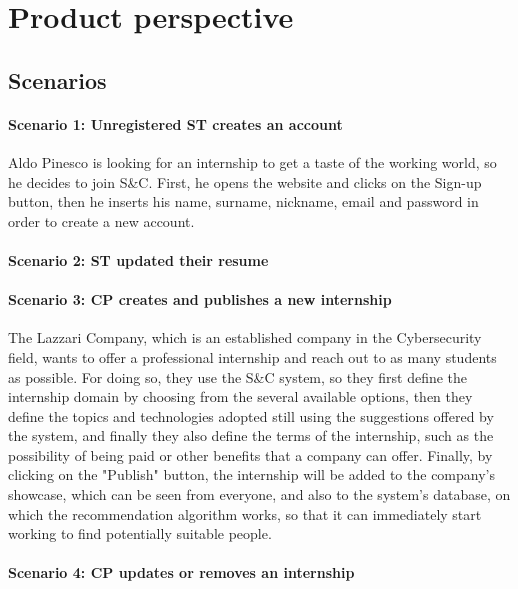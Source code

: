 \section{Product perspective}
\label{sec:product_perspective}%

\subsection{Scenarios}
\label{subsec:scenarios}%
\paragraph{Scenario 1: Unregistered ST creates an account}
Aldo Pinesco is looking for an internship to get a taste of the working world, so he decides to join S\&C. First, he opens the website and clicks on the Sign-up button, then he inserts his name, surname, nickname, email and password in order to create a new account.

\paragraph{Scenario 2: ST updated their resume}

\paragraph{Scenario 3: CP creates and publishes a new internship}
The Lazzari Company, which is an established company in the Cybersecurity field, wants to offer a professional internship and reach out to as many students as possible. For doing so, they use the S\&C system, so they first define the internship domain by choosing from the several available options, then they define the topics and technologies adopted still using the suggestions offered by the system, and finally they also define the terms of the internship, such as the possibility of being paid or other benefits that a company can offer. Finally, by clicking on the "Publish" button, the internship will be added to the company's showcase, which can be seen from everyone, and also to the system's database, on which the recommendation algorithm works, so that it can immediately start working to find potentially suitable people.

\paragraph{Scenario 4: CP updates or removes an internship}

